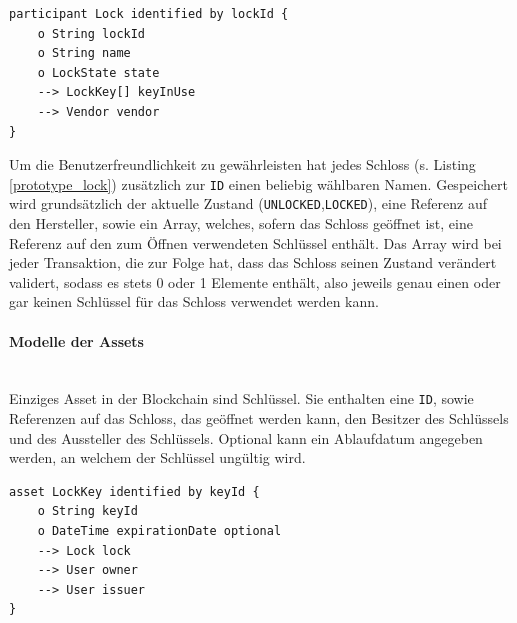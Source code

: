             \medskip
            \begin{lstlisting}[caption={Repräsantation eines Schlosses},label=prototype_lock,captionpos=b]
participant Lock identified by lockId {
    o String lockId
    o String name
    o LockState state
    --> LockKey[] keyInUse
    --> Vendor vendor
}
            \end{lstlisting}
            Um die Benutzerfreundlichkeit zu gewährleisten hat jedes Schloss (s. Listing \ref{prototype_lock}) zusätzlich zur \colorbox{light-gray}{\lstinline{ID}} einen beliebig wählbaren Namen. 
            Gespeichert wird grundsätzlich der aktuelle Zustand (\colorbox{light-gray}{\lstinline{UNLOCKED}},\colorbox{light-gray}{\lstinline{LOCKED}}), eine Referenz auf den Hersteller, sowie ein Array, welches, sofern das Schloss geöffnet ist, eine Referenz auf den zum Öffnen verwendeten Schlüssel enthält. 
            Das Array wird bei jeder Transaktion, die zur Folge hat, dass das Schloss seinen Zustand verändert  validert, sodass es stets 0 oder 1 Elemente enthält, also jeweils genau einen oder gar keinen Schlüssel für das Schloss verwendet werden kann.
            
        \paragraph{\textrm{Modelle der Assets}}\hspace{0cm}\\
            Einziges Asset in der Blockchain sind Schlüssel. 
            Sie enthalten eine \colorbox{light-gray}{\lstinline{ID}}, sowie Referenzen auf das Schloss, das geöffnet werden kann, den Besitzer des Schlüssels und des Aussteller des Schlüssels. 
            Optional kann ein Ablaufdatum angegeben werden, an welchem der Schlüssel ungültig wird.
            \medskip
            \begin{lstlisting}[caption={Repräsantation eines Schlüssels},label=prototype_key,captionpos=b]
asset LockKey identified by keyId {
    o String keyId
    o DateTime expirationDate optional
    --> Lock lock
    --> User owner
    --> User issuer
}
            \end{lstlisting}
        
